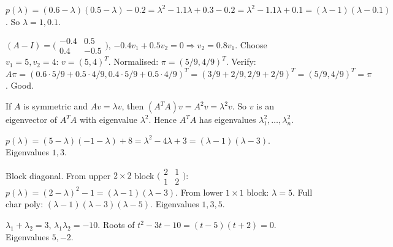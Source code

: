 \begin{solutions}
  \item $p(\lambda) = (0.6 - \lambda)(0.5 - \lambda) - 0.2 = \lambda^{2} - 1.1 \lambda + 0.3 - 0.2 = \lambda^{2} - 1.1 \lambda + 0.1 = (\lambda - 1)(\lambda - 0.1)$. So $\lambda = 1, 0.1$.
  \item $(A - I) = \bigl(\begin{smallmatrix} -0.4 & 0.5 \\ 0.4 & -0.5 \end{smallmatrix}\bigr)$, $-0.4 v_{1} + 0.5 v_{2} = 0 \Rightarrow v_{2} = 0.8 v_{1}$. Choose $v_{1} = 5, v_{2} = 4$: $v = (5, 4)^{T}$. Normalised: $\pi = (5/9, 4/9)^{T}$. Verify: $A \pi = (0.6 \cdot 5/9 + 0.5 \cdot 4/9, 0.4 \cdot 5/9 + 0.5 \cdot 4/9)^{T} = (3/9 + 2/9, 2/9 + 2/9)^{T} = (5/9, 4/9)^{T} = \pi$. Good.
  \item If $A$ is symmetric and $A v = \lambda v$, then $(A^{T} A) v = A^{2} v = \lambda^{2} v$. So $v$ is an eigenvector of $A^{T} A$ with eigenvalue $\lambda^{2}$. Hence $A^{T} A$ has eigenvalues $\lambda_{1}^{2}, \dots, \lambda_{n}^{2}$.
  \item $p(\lambda) = (5 - \lambda)(-1 - \lambda) + 8 = \lambda^{2} - 4 \lambda + 3 = (\lambda - 1)(\lambda - 3)$. Eigenvalues $1, 3$.
  \item Block diagonal. From upper $2 \times 2$ block $\bigl(\begin{smallmatrix} 2 & 1 \\ 1 & 2 \end{smallmatrix}\bigr)$: $p(\lambda) = (2 - \lambda)^{2} - 1 = (\lambda - 1)(\lambda - 3)$. From lower $1 \times 1$ block: $\lambda = 5$. Full char poly: $(\lambda - 1)(\lambda - 3)(\lambda - 5)$. Eigenvalues $1, 3, 5$.
  \item $\lambda_{1} + \lambda_{2} = 3$, $\lambda_{1} \lambda_{2} = -10$. Roots of $t^{2} - 3 t - 10 = (t - 5)(t + 2) = 0$. Eigenvalues $5, -2$.
\end{solutions}
